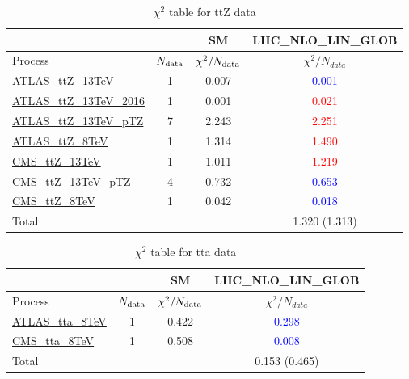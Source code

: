 \documentclass{article}
\begin{document}
\begin{table}[H]
\centering
\begin{tabular}{|l|c|c|c|}
\hline
 \multicolumn{2}{|c|}{} & SM& LHC_NLO_LIN_GLOB\\ \hline
Process & $N_{\rm data}$ & $\chi^ 2/N_{\rm data}$& $\chi^ 2/N_{data}$\\ \hline
\href{https://arxiv.org}{ATLAS_ttZ_13TeV} & 1 & 0.007 & \textcolor{blue}                            {0.001} \\ \hline
\href{https://arxiv.org}{ATLAS_ttZ_13TeV_2016} & 1 & 0.001 & \textcolor{red}                            {0.021} \\ \hline
\href{https://arxiv.org}{ATLAS_ttZ_13TeV_pTZ} & 7 & 2.243 & \textcolor{red}                            {2.251} \\ \hline
\href{https://arxiv.org}{ATLAS_ttZ_8TeV} & 1 & 1.314 & \textcolor{red}                            {1.490} \\ \hline
\href{https://arxiv.org}{CMS_ttZ_13TeV} & 1 & 1.011 & \textcolor{red}                            {1.219} \\ \hline
\href{https://arxiv.org}{CMS_ttZ_13TeV_pTZ} & 4 & 0.732 & \textcolor{blue}                            {0.653} \\ \hline
\href{https://arxiv.org}{CMS_ttZ_8TeV} & 1 & 0.042 & \textcolor{blue}                            {0.018} \\ \hline
\hline Total & &  & 1.320 (1.313) \\ \hline
\end{tabular}
\caption{$\chi^2$ table for ttZ data}
\end{table}
\begin{table}[H]
\centering
\begin{tabular}{|l|c|c|c|}
\hline
 \multicolumn{2}{|c|}{} & SM& LHC_NLO_LIN_GLOB\\ \hline
Process & $N_{\rm data}$ & $\chi^ 2/N_{\rm data}$& $\chi^ 2/N_{data}$\\ \hline
\href{https://arxiv.org}{ATLAS_tta_8TeV} & 1 & 0.422 & \textcolor{blue}                            {0.298} \\ \hline
\href{https://arxiv.org}{CMS_tta_8TeV} & 1 & 0.508 & \textcolor{blue}                            {0.008} \\ \hline
\hline Total & &  & 0.153 (0.465) \\ \hline
\end{tabular}
\caption{$\chi^2$ table for tta data}
\end{table}
\end{document}
